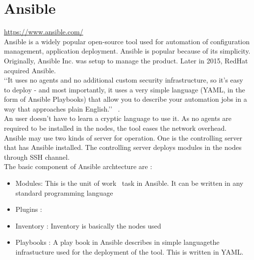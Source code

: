 \section{Ansible}
\url{ https://www.ansible.com/ } \\
Ansible is a widely popular open-source tool used for automation of configuration management,
application deployment. Ansible is popular because of its simplicity. Originally, Ansible Inc.
was setup to manage the product. Later in 2015, RedHat acquired Ansible.\\
‘‘It uses no agents and no additional custom security infrastructure, so it’s easy to deploy - 
and most importantly, it uses a very simple language (YAML, in the form of Ansible Playbooks) 
that allow you to describe your automation jobs in a way that approaches plain English.’’
~\cite {hid-sp18-417-doc-Ansible}. \\
An user doesn’t have to learn a cryptic language to use it. 
As no agents are required to be installed in the nodes, the tool eases the network overhead. \\
Ansible may use two kinds of server for operation. One is the controlling server that has Ansible installed.
The controlling server deploys modules in the nodes through SSH channel. \\
The basic component of Ansible archtecture are : \\
\begin{itemize}
\item        Modules: This is the unit of work \ task in Ansible. It can be written in any standard programming language
\item        Plugins :
\item        Inventory : Inventory is basically the nodes used
\item        Playbooks : A play book in Ansible describes in simple languagethe 
infrastucture used for the deployment of the tool. This is written in YAML.
\end{itemize}


